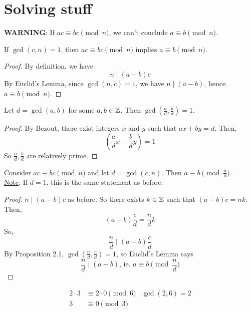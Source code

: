 \section{Solving stuff}
    \textbf{WARNING}: If $ac\equiv bc\pmod{n}$, we can't conclude $a\equiv b \pmod{n}$.
    \begin{theorem}
        If $\gcd(c,n)=1$, then $ac\equiv bc\pmod{n}$ implies $a\equiv b\pmod{n}$.
        \begin{proof}
            By definition, we  have
            \[ 
                n \mid (a-b)c 
            \] 
            By Euclid's Lemma, since $\gcd(n,c)=1$, we have
            $n\mid (a-b)$, hence $a\equiv b\pmod{n}$.
        \end{proof}
    \end{theorem}
    \begin{proposition}
        Let $d=\gcd(a,b)$ for some $a,b\in\mathbb{Z}$. 
        Then $\gcd(\frac{a}{d}, \frac{b}{d})=1$. 
        \begin{proof}
            By Bezout, there exist integers $x$ and $y$ such that $ax+by=d$.
            Then, \[ (\frac{a}{d}x+\frac{b}{d}y)=1 \]
            So $\frac{a}{d}, \frac{b}{d}$ are relatively prime.
        \end{proof}
    \end{proposition}
    \begin{theorem}
        Consider $ac\equiv bc \pmod{n}$ and let $d=\gcd(c,n)$. 
        Then $a\equiv b\pmod{\frac{n}{d}}$. \\
        \underline{Note}: If $d=1$, this is the same statement as before.
        \begin{proof}
            $n\mid (a-b)c$ as before. So there exists $k\in\mathbb{Z}$ such that
            $(a-b)c=nk$. Then,
            \[
                (a-b)\frac{c}{d} = \frac{n}{d}k 
            \]
            So, 
            \[ 
                \frac{n}{d}\mid (a-b)\frac{c}{d} 
            \]
            By Proposition 2.1, $\gcd(\frac{n}{d}, \frac{c}{d})=1$, so 
            Euclid's Lemma says 
            \[ 
                \frac{n}{d}\mid (a-b) \text{, ie. } a\equiv b\pmod{\frac{n}{d}}
            \]
        \end{proof}
        \begin{example}
            \begin{align*}
                2\cdot 3 &\equiv 2\cdot 0 \pmod{6} & \gcd(2,6)=2 \\
                3 &\equiv 0 \pmod{3}
            \end{align*}
        \end{example}
    \end{theorem}
    
